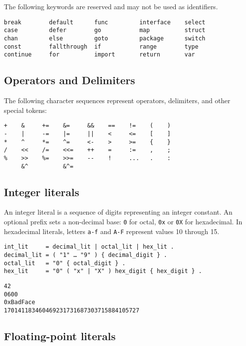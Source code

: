 The following keywords are reserved and may not be used as identifiers.

\begin{Verbatim}[frame=single]
break        default      func         interface    select
case         defer        go           map          struct
chan         else         goto         package      switch
const        fallthrough  if           range        type
continue     for          import       return       var
\end{Verbatim}

\subsection*{Operators and Delimiters}

The following character sequences represent
operators, delimiters, and other special tokens:

\begin{Verbatim}[frame=single]
+    &     +=    &=     &&    ==    !=    (    )
-    |     -=    |=     ||    <     <=    [    ]
*    ^     *=    ^=     <-    >     >=    {    }
/    <<    /=    <<=    ++    =     :=    ,    ;
%    >>    %=    >>=    --    !     ...   .    :
     &^          &^=
\end{Verbatim}

\subsection*{Integer literals}

An integer literal is a sequence of digits representing an
integer constant. An optional prefix sets a
non-decimal base: \texttt{0} for octal, \texttt{0x} or \texttt{0X} for
hexadecimal. In hexadecimal literals, letters \texttt{a-f} and
\texttt{A-F} represent values 10 through 15.

\begin{Verbatim}[frame=single]
int_lit     = decimal_lit | octal_lit | hex_lit .
decimal_lit = ( "1" … "9" ) { decimal_digit } .
octal_lit   = "0" { octal_digit } .
hex_lit     = "0" ( "x" | "X" ) hex_digit { hex_digit } .
\end{Verbatim}

\begin{Verbatim}[frame=single]
42
0600
0xBadFace
170141183460469231731687303715884105727
\end{Verbatim}

\subsection*{Floating-point literals}

